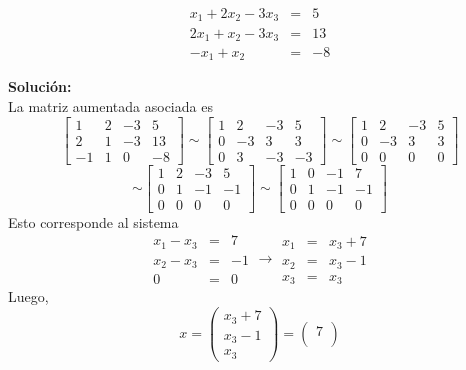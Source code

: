 \documentclass[12pt]{article}
\newenvironment{solucion}
{\begin{mdframed}[backgroundcolor=black!10]
		{\bf Solución:}\\
	}
	{
	\end{mdframed}
}
\newenvironment{preguntas}
{\begin{enumerate}\itemsep12pt
	}
	{
	\end{enumerate}
}
\newcommand{\ra}{\rightarrow}
\begin{document}
\begin{preguntas}
	$$
	\begin{array}{rcr}
	x_1 +2x_2-3x_3& = & 5\\
	2x_1 + x_2 - 3x_3& = & 13\\
	-x_1 + x_2 & = & -8
	\end{array}$$
\begin{solucion}
La matriz aumentada asociada es
		$$\left[
		\begin{array}{ccc|c}
		1 & 2 & -3 & 5\\
		2 & 1 & -3 & 13\\
		-1 & 1 & 0 & -8
		\end{array}
		\right] \sim \left[
		\begin{array}{ccc|c}
		1 & 2 & -3 & 5\\
		0 & -3 & 3 & 3\\
		0 & 3 & -3 & -3
		\end{array}
		\right] \sim \left[
		\begin{array}{ccc|c}
		1 & 2 & -3 & 5\\
		0 & -3 & 3 & 3\\
		0 & 0 & 0 & 0
		\end{array}
		\right]$$
		$$ \sim \left[
		\begin{array}{ccc|c}
		1 & 2 & -3 & 5\\
		0 & 1 & -1 & -1\\
		0 & 0 & 0 & 0
		\end{array}
		\right]  \sim \left[
		\begin{array}{ccc|c}
		1 & 0 & -1 & 7\\
		0 & 1 & -1 & -1\\
		0 & 0 & 0 & 0
		\end{array}
		\right] $$
		Esto corresponde al sistema
		$$\begin{array}{rcl}
		x_1 - x_3 & = & 7\\
		x_2 - x_3 & = & -1\\
		0 & = & 0
		\end{array} \ra \begin{array}{rcl}
		x_1 & = & x_3 + 7\\
		x_2 & = & x_3 - 1\\
		x_3 & = & x_3
		\end{array} $$
		Luego,
		$$x = \begin{pmatrix}
		x_3 + 7\\
		x_3 - 1\\
		x_3
		\end{pmatrix} = \begin{pmatrix}
		7\\

\end{pmatrix}$$
\end{solucion}
\end{preguntas}
\end{document}
